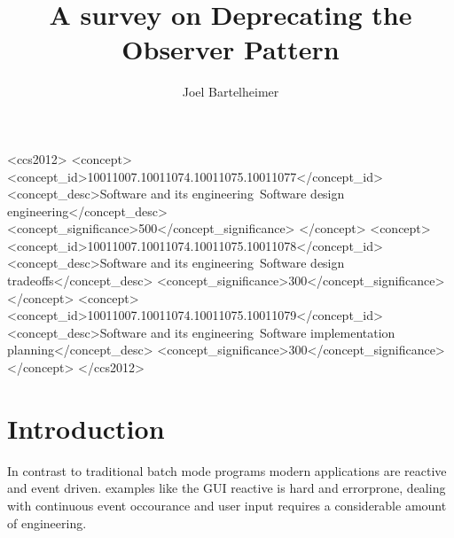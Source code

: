 \documentclass[acmsmall]{acmart}\settopmatter{printfolios=true,printccs=false,printacmref=false}
\begin{document}
\title{A survey on Deprecating the Observer Pattern}

\author{Joel Bartelheimer}


\renewcommand\shortauthors{Bartelheimer, J. }

\begin{abstract}
	\blindtext
\end{abstract}


%
%
\begin{CCSXML}
	<ccs2012>
	<concept>
	<concept_id>10011007.10011074.10011075.10011077</concept_id>
	<concept_desc>Software and its engineering~Software design engineering</concept_desc>
	<concept_significance>500</concept_significance>
	</concept>
	<concept>
	<concept_id>10011007.10011074.10011075.10011078</concept_id>
	<concept_desc>Software and its engineering~Software design tradeoffs</concept_desc>
	<concept_significance>300</concept_significance>
	</concept>
	<concept>
	<concept_id>10011007.10011074.10011075.10011079</concept_id>
	<concept_desc>Software and its engineering~Software implementation planning</concept_desc>
	<concept_significance>300</concept_significance>
	</concept>
	</ccs2012>
\end{CCSXML}

%
%
\maketitle


\section{Introduction}

	In contrast to traditional batch mode programs modern applications are reactive and event driven. 
	examples like the GUI 
	reactive is hard and errorprone, dealing with continuous event occourance and user input requires a considerable amount of engineering.
	
\end{document}
